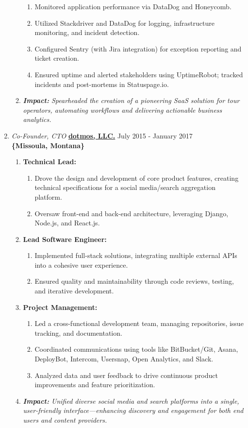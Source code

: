 \documentclass[oneside]{article}%
\begin{document}
\begin{enumerate}[]
\begin{enumerate}[]
				\begin{enumerate}[-]
					\item Monitored application performance via DataDog and Honeycomb.
					\item Utilized Stackdriver and DataDog for logging, infrastructure monitoring, and incident detection.
					\item Configured Sentry (with Jira integration) for exception reporting and ticket creation.
					\item Ensured uptime and alerted stakeholders using UptimeRobot; tracked incidents and post-mortems in Statuspage.io.
				\end{enumerate}
			\item \textit{\textbf{Impact:} Spearheaded the creation of a pioneering SaaS solution for tour operators, 
automating workflows and delivering actionable business analytics.}
		\end{enumerate}
	\item \textit{Co-Founder, CTO} \textbf{\href{https://dotmos.com}{dotmos, LLC.}} \hfill July 2015 - January 2017\\
		\textbf{\{Missoula, Montana\}}
		\begin{enumerate}[]
			\item \textbf{Technical Lead:}
				\begin{enumerate}[-]
					\item Drove the design and development of core product features, creating technical specifications for a social media/search aggregation platform.
					\item Oversaw front-end and back-end architecture, leveraging Django, Node.js, and React.js.
				\end{enumerate}
			\item \textbf{Lead Software Engineer:}
				\begin{enumerate}[-]
					\item Implemented full-stack solutions, integrating multiple external APIs into a cohesive user experience.
					\item Ensured quality and maintainability through code reviews, testing, and iterative development.
				\end{enumerate}
			\item \textbf{Project Management:}
				\begin{enumerate}[-]
					 \item Led a cross-functional development team, managing repositories, issue tracking, and documentation.
					 \item Coordinated communications using tools like BitBucket/Git, Asana, DeployBot, Intercom, Usersnap, Open Analytics, and Slack.
					 \item Analyzed data and user feedback to drive continuous product improvements and feature prioritization.
				\end{enumerate}
			 \item \textit{\textbf{Impact:} Unified diverse social media and search platforms into a single, user-friendly interface—enhancing discovery and engagement for both end users and content providers.}
		\end{enumerate}


\end{enumerate}
\end{document}
